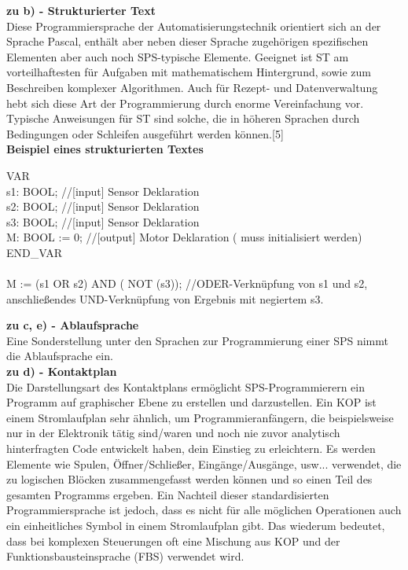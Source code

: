 	\color{black}
	\textbf{zu b) - Strukturierter Text}\\
	
	Diese Programmiersprache der Automatisierungstechnik orientiert sich an der Sprache Pascal, enthält aber neben dieser Sprache zugehörigen spezifischen Elementen aber auch noch SPS-typische Elemente. Geeignet ist ST am vorteilhaftesten für Aufgaben mit mathematischem Hintergrund, sowie zum Beschreiben komplexer Algorithmen. Auch für Rezept- und Datenverwaltung hebt sich diese Art der Programmierung durch enorme Vereinfachung vor. Typische Anweisungen für ST sind solche, die in höheren Sprachen durch Bedingungen oder Schleifen ausgeführt werden können.[5]\\
	
	\textbf{Beispiel eines strukturierten Textes}
	\begin{framed}
	VAR\\
	s1: BOOL; \color{gray}//[input] Sensor Deklaration\\ \color{black}
	s2: BOOL; \color{gray}//[input] Sensor Deklaration\\ \color{black}
	s3: BOOL; \color{gray}//[input] Sensor Deklaration\\ \color{black}
	M: BOOL := 0; \color{gray}//[output] Motor Deklaration ( muss initialisiert werden)\\ \color{black}
	END\_VAR\\\\
	M := (s1 OR s2) AND ( NOT (s3)); \color{gray}//ODER-Verknüpfung von s1 und s2, anschließendes UND-Verknüpfung von Ergebnis mit negiertem s3.\color{black}
	\end{framed}


	\textbf{zu c, e) - Ablaufsprache}\\
	
	Eine Sonderstellung unter den Sprachen zur Programmierung einer SPS nimmt die Ablaufsprache ein. \\
	
	\textbf{zu d) - Kontaktplan}\\
	
	Die Darstellungsart des Kontaktplans ermöglicht SPS-Programmierern ein Programm auf graphischer Ebene zu erstellen und darzustellen. Ein KOP ist einem Stromlaufplan sehr ähnlich, um Programmieranfängern, die beispielsweise nur in der Elektronik tätig sind/waren und noch nie zuvor analytisch hinterfragten Code entwickelt haben, dein Einstieg zu erleichtern. Es werden Elemente wie Spulen, Öffner/Schließer, Eingänge/Ausgänge, usw... verwendet, die zu logischen Blöcken zusammengefasst werden können und so einen Teil des gesamten Programms ergeben. Ein Nachteil dieser standardisierten Programmiersprache ist jedoch, dass es nicht für alle möglichen Operationen auch ein einheitliches Symbol in einem Stromlaufplan gibt. Das wiederum bedeutet, dass bei komplexen Steuerungen oft eine Mischung aus KOP und der Funktionsbausteinsprache (FBS) verwendet wird.\\
	
